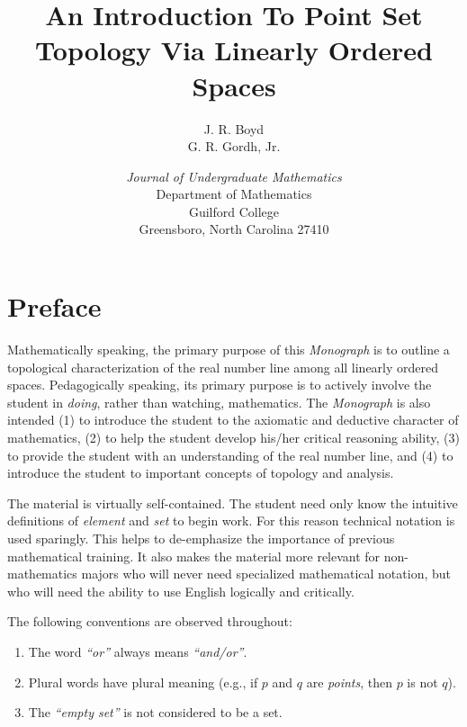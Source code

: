 \documentclass{book}
\let\titlepageAuthor\author
\renewcommand{\author}[1]{\newcommand{\headerAuthor}{#1}\titlepageAuthor{#1}}
\let\titlepageTitle\title
\renewcommand{\title}[1]{\newcommand{\headerTitle}{#1}\titlepageTitle{#1}}
\begin{document}
\thispagestyle{empty}
\title{An Introduction To Point Set Topology Via Linearly Ordered Spaces}
\author{J. R. Boyd \\ G. R. Gordh, Jr.}
\date{\vspace{3cm}
\emph{Journal of Undergraduate Mathematics}\\
Department of Mathematics\\
Guilford College\\
Greensboro, North Carolina 27410
}
\maketitle


\thispagestyle{empty}
\setcounter{tocdepth}{3} 
\tableofcontents
\thispagestyle{empty}



\chapter*{Preface}


Mathematically speaking, the primary purpose of this \emph{Monograph} is to outline a topological characterization of the real number line among all linearly ordered spaces. Pedagogically speaking, its primary purpose is to actively involve the student in \emph{doing}, rather than watching, mathematics. The \emph{Monograph} is also intended (1) to introduce the student to the axiomatic and deductive character of mathematics, (2) to help the student develop his/her critical reasoning ability, (3) to provide the student with an understanding of the real number line, and (4) to introduce the student to important concepts of topology and analysis.

The material is virtually self-contained. The student need only know the intuitive definitions of \emph{element} and \emph{set} to begin work. For this reason technical notation is used sparingly. This helps to de-emphasize the importance of previous mathematical training. It also makes the material more relevant for non-mathematics majors who will never need specialized mathematical notation, but who will need the ability to use English logically and critically.

The following conventions are observed throughout: 
\begin{enumerate}[\hspace{1cm}(a)]
  \item The word \emph{``or''} always means \emph{``and/or''}.
  \item Plural words have plural meaning (e.g., if $p$ and $q$ are \emph{points}, then $p$ is not $q$). 
  \item The \emph{``empty set''} is not considered to be a set. 
\end{enumerate}
\end{document}

